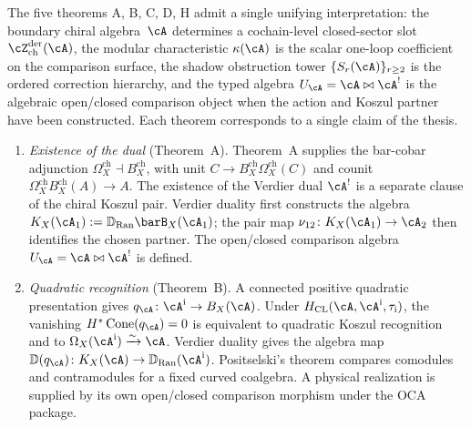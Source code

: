 \begin{conjecture}
\label{conj:boundary-bulk-thesis}
\ClaimStatusConjectured
{}%
%
%
%
The five theorems A, B, C, D, H admit a single unifying
interpretation: the boundary chiral algebra~$\cA$ determines a
cochain-level closed-sector slot
$\cZ^{\mathrm{der}}_{\mathrm{ch}}(\cA)$, the modular characteristic
$\kappa(\cA)$ is the scalar one-loop coefficient on the comparison
surface, the shadow obstruction tower $\{S_r(\cA)\}_{r \ge 2}$ is the
ordered correction hierarchy, and the typed algebra
$U_\cA = \cA \bowtie \cA^!$ is the algebraic open/closed comparison
object when the action and Koszul partner have been constructed.
Each theorem corresponds to a single claim of the thesis.
\begin{enumerate}[label=\textup{(\Alph*)}]
\item \emph{Existence of the dual}
 \textup{(}Theorem~A\textup{)}.
 Theorem~A supplies the bar-cobar adjunction
 $\Omega_X^{\mathrm{ch}}\dashv B_X^{\mathrm{ch}}$, with unit
 $C\to B_X^{\mathrm{ch}}\Omega_X^{\mathrm{ch}}(C)$ and counit
 $\Omega_X^{\mathrm{ch}}B_X^{\mathrm{ch}}(A)\to A$. The existence of
 the Verdier dual $\cA^!$ is a separate clause of the chiral Koszul
 pair.  Verdier duality first constructs the algebra
 $K_X(\cA_1):=\mathbb{D}_{\mathrm{Ran}}\barB_X(\cA_1)$; the pair map
 $\nu_{12}\colon K_X(\cA_1)\to\cA_2$ then identifies the chosen
 partner.  The open/closed comparison algebra
 $U_\cA = \cA\bowtie\cA^!$ is defined.

\item \emph{Quadratic recognition}
 \textup{(}Theorem~B\textup{)}.
 A connected positive quadratic presentation gives
 $q_\cA\colon\cA^{\mathrm i}\to B_X(\cA)$. Under
 $H_{\mathrm{CL}}(\cA,\cA^{\mathrm i},\tau_{\mathrm i})$, the
 vanishing $H^*\operatorname{Cone}(q_\cA)=0$ is equivalent to
 quadratic Koszul recognition and to
 $\Omega_X(\cA^{\mathrm i})\xrightarrow{\sim}\cA$.
 Verdier duality gives the algebra map
 $\mathbb D(q_\cA)\colon K_X(\cA)\to
 \mathbb D_{\mathrm{Ran}}(\cA^{\mathrm i})$.
 Positselski's theorem compares comodules and contramodules for a
 fixed curved coalgebra. A physical realization is supplied by its
 own open/closed comparison morphism under the OCA package.


\end{enumerate}
\end{conjecture}
